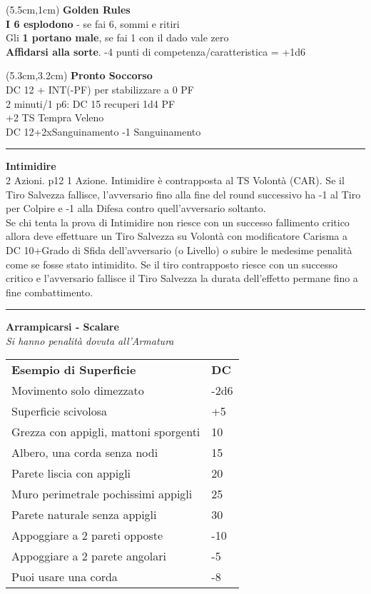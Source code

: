 \documentclass[a4paper,12 pt,openany]{book}
\newcommand{\riga}{\rule{\textwidth}{0.4pt}}
\begin{document}
\begin{textblock*}{14.5cm}(5.5cm,1cm) %
\textbf{Golden Rules}\\

{\textbf{I 6 esplodono}} - se fai 6, sommi e ritiri\\
Gli \textbf{1 portano male}, se fai 1 con il dado vale zero\\
\textbf{Affidarsi alla sorte}. -4 punti di competenza/caratteristica = +1d6\\
\end{textblock*}


\begin{textblock*}{7.4cm}(5.3cm,3.2cm) %
\textbf{Pronto Soccorso}\\
DC 12 + INT(-PF) per stabilizzare a 0 PF\\
2 minuti/1 p6: DC 15 recuperi 1d4 PF\\
+2 TS Tempra Veleno\\
DC 12+2xSanguinamento -1 Sanguinamento

\riga

\textbf{Intimidire}\\
2 Azioni. p12 1 Azione. Intimidire è contrapposta al TS Volontà (CAR). Se il Tiro Salvezza fallisce, l’avversario fino alla fine del round successivo ha -1 al Tiro per Colpire e -1 alla Difesa contro quell’avversario soltanto.\\
Se chi tenta la prova di Intimidire non riesce con un successo fallimento critico allora deve effettuare un Tiro Salvezza su Volontà con modificatore Carisma a DC 10+Grado di Sfida dell'avversario (o Livello) o subire le medesime penalità come se fosse stato intimidito.
Se il tiro contrapposto riesce con un successo critico e l'avversario fallisce il Tiro Salvezza la durata dell'effetto permane fino a fine combattimento.

\riga

\textbf{Arrampicarsi - Scalare}\\
\textit{Si hanno penalità dovuta all'Armatura}

\begin{tabular}{ll}
\textbf{Esempio di Superficie} & \textbf{DC}\\
Movimento solo dimezzato & -2d6\\
Superficie scivolosa&+5\\
Grezza con appigli, mattoni sporgenti&10\\
Albero, una corda senza nodi&15\\
Parete liscia con appigli &20\\
Muro perimetrale pochissimi appigli&25\\
Parete naturale senza appigli&30\\
Appoggiare a 2 pareti opposte&-10\\
Appoggiare a 2 parete angolari&-5\\
Puoi usare una corda&-8\\
\end{tabular}


\end{textblock*}
\end{document}
